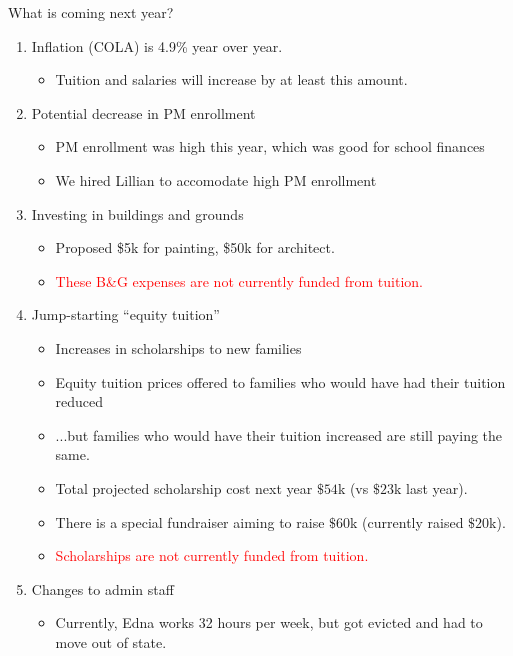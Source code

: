 \documentclass[8pt]{beamer}
\begin{document}
\begin{frame}{What is coming next year?}

%
\begin{enumerate}
%
\item Inflation (COLA) is 4.9\% year over year.
%
    \begin{itemize}
    \item Tuition and salaries will increase by at least this amount.
    \end{itemize}
%
\pause
\item Potential decrease in PM enrollment
%
    \begin{itemize}
    \item PM enrollment was high this year, which was good for school finances
    \item We hired Lillian to accomodate high PM enrollment
    \end{itemize}
%
\pause
\item Investing in buildings and grounds
%
    \begin{itemize}
    \item Proposed \$5k for painting, \$50k for architect.
    \item \textcolor{red}{These B\&G expenses are not currently funded from tuition.}
    \end{itemize}
%
\pause
\item Jump-starting ``equity tuition''
    \begin{itemize}
    \item Increases in scholarships to new families
    \item Equity tuition prices offered to families who would have had their
    tuition reduced
    \item ...but families who would have their tuition increased are still paying
    the same.
    \item Total projected scholarship cost next year $\$54$k (vs $\$23$k last year).
    \item There is a special fundraiser aiming to raise $\$60$k (currently
    raised $\$20$k).
    \item \textcolor{red}{Scholarships are not currently funded from tuition.}
    \end{itemize}
%
\pause
\item Changes to admin staff
    \begin{itemize}
        \item Currently, Edna works 32 hours per week, but got evicted and had to move out of state.

\end{itemize}
\end{enumerate}
\end{frame}
\end{document}
